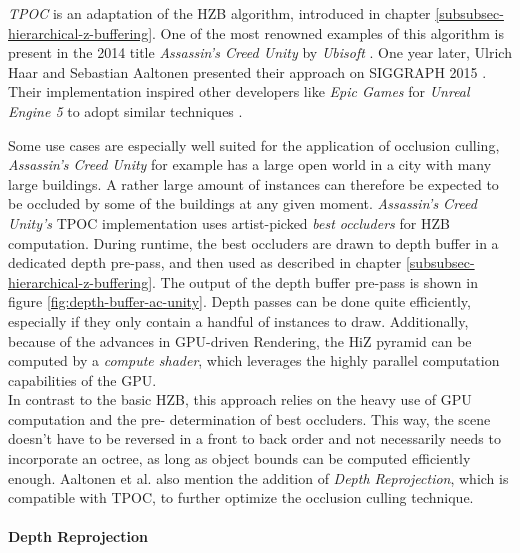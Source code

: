 \noindent
\emph{\ac{TPOC}} is an adaptation of the \ac{HZB} algorithm, introduced in chapter \ref{subsubsec-hierarchical-z-buffering}. 
One of the most renowned examples of this algorithm is present in the 2014 title \emph{Assassin's Creed Unity} by \emph{Ubisoft} 
\cite{Ubisoft2014}. One year later, Ulrich Haar and Sebastian Aaltonen presented their approach on SIGGRAPH 2015 
\cite{Aaltonen2015}. Their implementation inspired other developers like \emph{Epic Games} for \emph{Unreal Engine 5} 
to adopt similar techniques \cite{Karis2021}.

\noindent
Some use cases are especially well suited for the application of occlusion culling, \emph{Assassin's Creed Unity} for 
example has a large open world in a city with many large buildings. A rather large amount of instances can therefore be 
expected to be occluded by some of the buildings at any given moment. \emph{Assassin's Creed Unity's} \ac{TPOC} 
implementation uses artist-picked \emph{best occluders} for \ac{HZB} computation. During runtime, the best occluders are 
drawn to depth buffer in a dedicated depth pre-pass, and then used as described in chapter \ref{subsubsec-hierarchical-z-buffering}. 
The output of the depth buffer pre-pass is shown in figure \ref{fig:depth-buffer-ac-unity}. Depth passes can be done 
quite efficiently, especially if they only contain a handful of instances to draw. Additionally, because of the advances 
in \ac{GPU}-driven Rendering, the \ac{HiZ} pyramid can be computed by a \emph{compute shader}, which leverages the 
highly parallel computation capabilities of the \ac{GPU}. \\

\noindent
In contrast to the basic \ac{HZB}, this approach relies on the heavy use of \ac{GPU} computation and the pre-
determination of best occluders. This way, the scene doesn't have to be reversed in a front to back order and 
not necessarily needs to incorporate an octree, as long as object bounds can be computed efficiently enough.
Aaltonen et al. \cite{Aaltonen2015} also mention the addition of \emph{Depth Reprojection}, which is compatible 
with \ac{TPOC}, to further optimize the occlusion culling technique.


\paragraph*{Depth Reprojection} \label{subsubsec-depth-reprojection}

